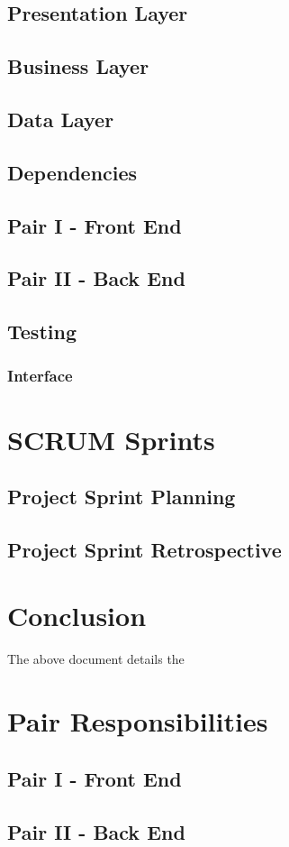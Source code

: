 \documentclass{article}
\begin{document}
\subsection{Presentation Layer}
\subsection{Business Layer}
\subsection{Data Layer}
\subsection{Dependencies}

\subsection{Pair I - Front End}

\subsection{Pair II - Back End}

\subsection{Testing}
\subsubsection{Interface}

\section{SCRUM Sprints}

\subsection{Project Sprint Planning}

\subsection{Project Sprint Retrospective}

\section{Conclusion}
The above document details the 



\appendix

\section{Pair Responsibilities}

\subsection{Pair I - Front End}

\subsection{Pair II - Back End}
\end{document}
